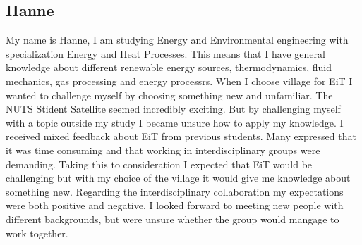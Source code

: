 \subsection{Hanne}

My name is Hanne, I am studying Energy and Environmental engineering with specialization Energy and Heat Processes. This means that I have general knowledge about different renewable energy sources, thermodynamics, fluid mechanics, gas processing and energy processrs. When I choose village for EiT I wanted to challenge myself by choosing something new and unfamiliar. The NUTS Stident Satellite seemed incredibly exciting. But by challenging myself with a topic outside my study I became unsure how to apply my knowledge. I received mixed feedback about EiT from previous students. Many expressed that it was time consuming and that working in interdisciplinary groups were demanding. Taking this to consideration I expected that EiT would be challenging but with my choice of the village it would give me knowledge about something new. Regarding the interdisciplinary collaboration my expectations were both positive and negative. I looked forward to meeting new people with different backgrounds, but were unsure whether the group would mangage to work together. 